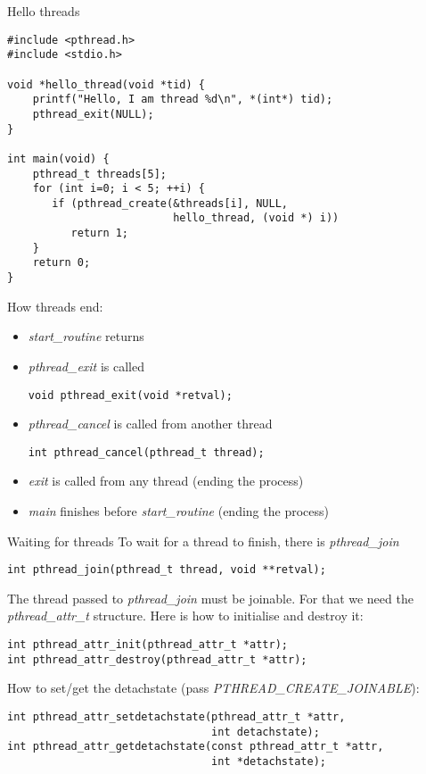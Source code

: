 \begin{frame}[fragile]{Hello threads}
    \begin{lstlisting}
#include <pthread.h>
#include <stdio.h>

void *hello_thread(void *tid) {
    printf("Hello, I am thread %d\n", *(int*) tid);
    pthread_exit(NULL);
}

int main(void) {
    pthread_t threads[5];
    for (int i=0; i < 5; ++i) {
       if (pthread_create(&threads[i], NULL,
                          hello_thread, (void *) i))
          return 1;
    }
    return 0;
}

\end{lstlisting}
\end{frame}
\begin{frame}[fragile]{How threads end:}
    \begin{itemize}
        \item \textit{start\_routine} returns
        \item \textit{pthread\_exit} is called
        \begin{lstlisting}[numbers=none]
void pthread_exit(void *retval);
\end{lstlisting}
        \item \textit{pthread\_cancel} is called from another thread
        \begin{lstlisting}[numbers=none]
int pthread_cancel(pthread_t thread);
\end{lstlisting}
        \item \textit{exit} is called from any thread (ending the process)
        \item \textit{main} finishes before \textit{start\_routine} (ending the process)
    \end{itemize}
\end{frame}
\begin{frame}[fragile]{Waiting for threads}
    To wait for a thread to finish, there is \textit{pthread\_join}
    \begin{lstlisting}[numbers=none]
int pthread_join(pthread_t thread, void **retval);
\end{lstlisting}
   
    \bigskip
    The thread passed to \textit{pthread\_join} must be joinable. For that we need the
    \textit{pthread\_attr\_t} structure. Here is how to initialise and destroy it:\\
        \begin{lstlisting}[numbers=none]
int pthread_attr_init(pthread_attr_t *attr);
int pthread_attr_destroy(pthread_attr_t *attr);
\end{lstlisting}
    \bigskip
    How to set/get the detachstate (pass \textit{PTHREAD\_CREATE\_JOINABLE}):
    \begin{lstlisting}[numbers=none]
int pthread_attr_setdetachstate(pthread_attr_t *attr,
                                int detachstate);
int pthread_attr_getdetachstate(const pthread_attr_t *attr,
                                int *detachstate);
\end{lstlisting}
\end{frame}


